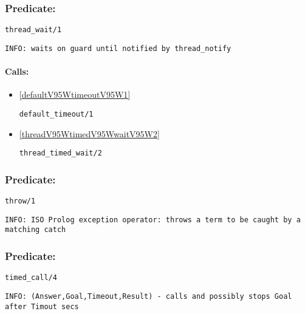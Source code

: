 \subsubsection{Predicate:} \label{threadV95WwaitV95W1}

\begin{verbatim}
thread_wait/1
\end{verbatim}

{\small \begin{verbatim}
INFO: waits on guard until notified by thread_notify

\end{verbatim}}
\paragraph{Calls:} 
\begin{itemize}
\item \ref{defaultV95WtimeoutV95W1} 
\begin{verbatim}
default_timeout/1
\end{verbatim}

\item \ref{threadV95WtimedV95WwaitV95W2} 
\begin{verbatim}
thread_timed_wait/2
\end{verbatim}

\end{itemize}

\subsubsection{Predicate:} \label{throwV95W1}

\begin{verbatim}
throw/1
\end{verbatim}

{\small \begin{verbatim}
INFO: ISO Prolog exception operator: throws a term to be caught by a matching catch

\end{verbatim}}

\subsubsection{Predicate:} \label{timedV95WcallV95W4}

\begin{verbatim}
timed_call/4
\end{verbatim}

{\small \begin{verbatim}
INFO: (Answer,Goal,Timeout,Result) - calls and possibly stops Goal after Timout secs

\end{verbatim}}
